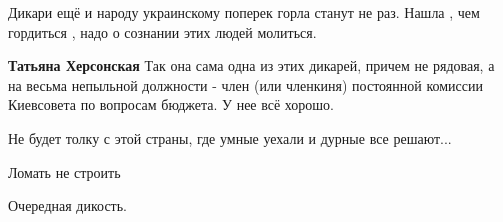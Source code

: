 \begin{itemize}
 
Дикари ещё и народу украинскому поперек горла станут не раз. Нашла , чем гордиться , надо о сознании этих людей молиться.

\begin{itemize}
 
\textbf{Татьяна Херсонская} Так она сама одна из этих дикарей, причем не рядовая, а на весьма непыльной должности - член (или членкиня) постоянной комиссии Киевсовета по вопросам бюджета. У нее всё хорошо.
\end{itemize}

 
Не будет толку с этой страны, где умные уехали и дурные все решают...

 
Ломать не строить

 
Очередная дикость.

\begin{itemize}
 

\end{itemize}
\end{itemize}
